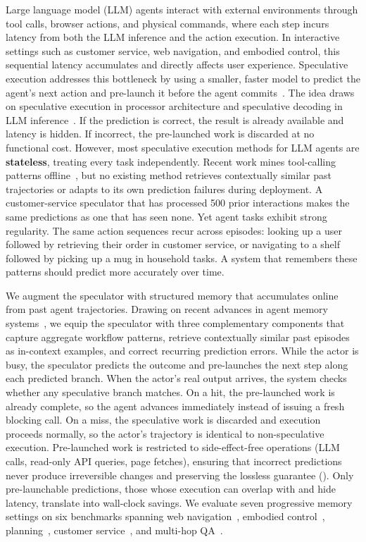 \documentclass{article}
\begin{document}
Large language model (LLM) agents interact with external environments through tool calls, browser actions, and physical commands, where each step incurs latency from both the LLM inference and the action execution.  In interactive settings such as customer service, web navigation, and embodied control, this sequential latency accumulates and directly affects user experience. Speculative execution addresses this bottleneck by using a smaller, faster model to predict the agent's next action and pre-launch it before the agent commits~\citep{ye2025speculative}. The idea draws on speculative execution in processor architecture and speculative decoding in LLM inference~\citep{leviathan2023speculative}. If the prediction is correct, the result is already available and latency is hidden. If incorrect, the pre-launched work is discarded at no functional cost. However, most speculative execution methods for LLM agents are \textbf{stateless}, treating every task independently. Recent work mines tool-calling patterns offline~\citep{sui2026paste}, but no existing method retrieves contextually similar past trajectories or adapts to its own prediction failures during deployment. A customer-service speculator that has processed 500 prior interactions makes the same predictions as one that has seen none. Yet agent tasks exhibit strong regularity. The same action sequences recur across episodes: looking up a user followed by retrieving their order in customer service, or navigating to a shelf followed by picking up a mug in household tasks. A system that remembers these patterns should predict more accurately over time.

We augment the speculator with structured memory that accumulates online from past agent trajectories. Drawing on recent advances in agent memory systems~\citep{wang2024awm,zhao2024expel,ouyang2025reasoningbank}, we equip the speculator with three complementary components that capture aggregate workflow patterns, retrieve contextually similar past episodes as in-context examples, and correct recurring prediction errors. While the actor is busy, the speculator predicts the outcome and pre-launches the next step along each predicted branch. When the actor's real output arrives, the system checks whether any speculative branch matches. On a hit, the pre-launched work is already complete, so the agent advances immediately instead of issuing a fresh blocking call. On a miss, the speculative work is discarded and execution proceeds normally, so the actor's trajectory is identical to non-speculative execution. Pre-launched work is restricted to side-effect-free operations (LLM calls, read-only API queries, page fetches), ensuring that incorrect predictions never produce irreversible changes and preserving the lossless guarantee (). Only pre-launchable predictions, those whose execution can overlap with and hide latency, translate into wall-clock savings. We evaluate seven progressive memory settings on six benchmarks spanning web navigation~\citep{zhou2024webarena,koh2024vwa}, embodied control~\citep{shridhar2021alfworld}, planning~\citep{vallati2015ipc}, customer service~\citep{yao2024tau, barres2025tau2}, and multi-hop QA~\citep{yang2018hotpotqa}.
\end{document}
